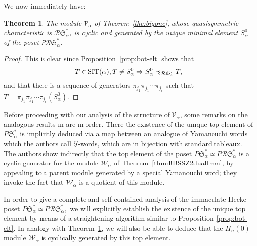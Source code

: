 \documentclass[12pt,letterpaper]{amsart}
\newtheorem{theorem}{Theorem}[section]
\theoremstyle{definition}
\newcommand{\poRI}{\preccurlyeq_{\mathcal{R}{\mathfrak{S}}^\ast _\alpha}}  \newcommand{\poA}{\preccurlyeq_{\mathcal{A}^\ast _\alpha}}  \newcommand{\poAbar}{\preccurlyeq_{\mathcal{\bar{A}}^\ast _\alpha} } \newcommand{\poRIcover}{\prec_{\mathcal{R}{\mathfrak{S}}^\ast _\alpha}}
\newcommand{\dI}{\mathfrak{S}^*}
\newcommand{\rdI}{\mathcal{R}\mathfrak{S}^*}
\newcommand{\hn}{H_n(0)}
\begin{document}
We now immediately have:
\begin{theorem}\label{thm:cyclic-rdI}  The module $\mathcal{V}_\alpha$ of Theorem~\ref{the:bigone}, whose quasisymmetric characteristic is $\rdI_\alpha$,  is cyclic and generated by the unique minimal element $S^0_\alpha$  of the poset $P\rdI_\alpha.$
\end{theorem}
\begin{proof} This is clear since  Proposition~\ref{prop:bot-elt} shows that 
\[T\in \SIT(\alpha), T\ne S^0_\alpha\Rightarrow S^0_\alpha\poRI T,\] and that there is a sequence of generators $\pi_{j_1}\pi_{j_1}\cdots \pi_{j_r} $ such that $T=\pi_{j_1}\pi_{j_1}\cdots \pi_{j_r}(S^0_\alpha).$
\end{proof}
Before proceeding with our analysis of the structure of $\mathcal{V}_\alpha$, some remarks on the analogous results in \cite{BBSSZ2015} are in order. There   the existence of the unique top element  of $P\dI_\alpha$ is implicitly deduced via a map between an analogue of Yamanouchi words which the authors call $\mathcal{Y}$-words, which are in  bijection with standard tableaux. The authors   show indirectly that the top element of the poset $P\dI_\alpha\simeq P\rdI_\alpha$ is a cyclic generator for the module $\mathcal{W}_\alpha$ of Theorem~\ref{thm:BBSSZ2dualImm}, by appealing to a parent module generated by a special Yamanouchi word; they invoke the fact that  $\mathcal{W}_\alpha$ is a quotient of this module.

In order to give a complete and self-contained analysis of the immaculate Hecke poset $P\dI_\alpha\simeq P\rdI_\alpha,$  we will explicitly establish the existence of the unique top element  by means of a straightening algorithm similar to Proposition~\ref{prop:bot-elt}.  In analogy with Theorem~\ref{thm:cyclic-rdI}, we will also be able to deduce that the $\hn$-module $\mathcal{W}_\alpha$  is cyclically generated by this top element.
\end{document}
